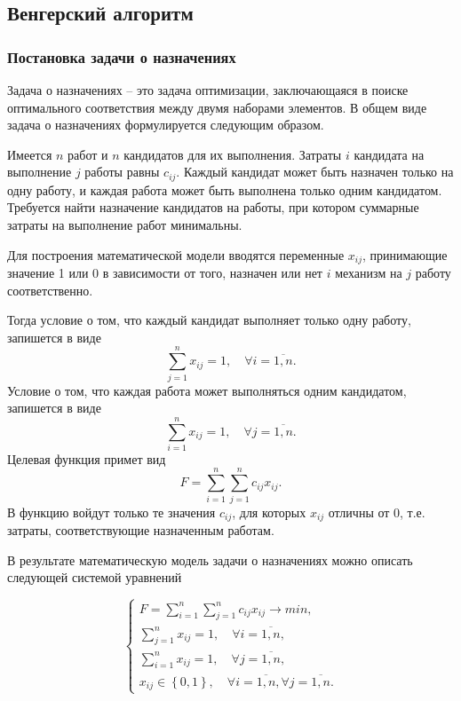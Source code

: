 \documentclass[14pt,a4paper]{extarticle}
\begin{document}
\subsection{Венгерский алгоритм} \label{Hang}
\subsubsection*{Постановка задачи о назначениях}
Задача о назначениях -- это задача оптимизации, заключающаяся в поиске оптимального соответствия между двумя наборами элементов. В общем виде задача о назначениях формулируется следующим образом. 

Имеется $n$ работ и $n$ кандидатов для их выполнения. Затраты $i$ кандидата на выполнение $j$ работы равны $c_{ij}$. Каждый кандидат может быть назначен только на одну работу, и каждая работа может быть выполнена только одним кандидатом. Требуется найти назначение кандидатов на работы, при котором суммарные затраты на выполнение работ минимальны. 

Для построения математической модели вводятся переменные $x_{ij}$, принимающие значение 1 или 0 в зависимости от того, назначен или нет $i$ механизм на $j$ работу соответственно.

Тогда условие о том, что каждый кандидат выполняет только одну работу, запишется в виде 
\begin{equation}
\sum_{j=1}^{n} x_{ij} = 1, \quad \forall i = \overline{1,n}.
\end{equation}
Условие о том, что каждая работа может выполняться одним кандидатом, запишется в виде
\begin{equation}
\sum_{i=1}^{n} x_{ij} = 1, \quad \forall j = \overline{1,n}.
\end{equation}
Целевая функция примет вид
\begin{equation}
F = \sum_{i=1}^{n}\sum_{j=1}^{n} c_{ij} x_{ij}.
\end{equation}
В функцию войдут только те значения $c_{ij}$, для которых $x_{ij}$ отличны от 0, т.е. затраты, соответствующие назначенным работам.

В результате математическую модель задачи о назначениях можно описать следующей системой уравнений

\begin{equation}
  \left\{\begin{array}{l}
	F = \sum_{i=1}^{n}\sum_{j=1}^{n} c_{ij} x_{ij} \longrightarrow min,\\
	\sum_{j=1}^{n} x_{ij} = 1, \quad \forall i = \overline{1,n},\\
	\sum_{i=1}^{n} x_{ij} = 1, \quad \forall j = \overline{1,n},\\
	x_{ij} \in \left\{0, 1\right\}, \quad \forall i = \overline{1,n}, \forall j = \overline{1,n}.
	\end{array}\right.
\end{equation}
\end{document}

